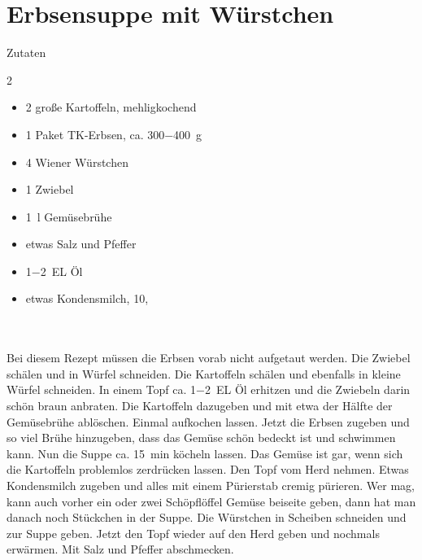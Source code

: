 \section*{Erbsensuppe mit Würstchen}
\ihead{}\ohead{}
\cfoot{}
{\Large Zutaten}
\begin{multicols}{2}
\begin{itemize}
\item \num{2} große Kartoffeln, mehligkochend
\item \num{1} Paket TK-Erbsen, ca. \SI{300-400}{g}
\item \num{4} Wiener Würstchen
\item \num{1} Zwiebel
\item \SI{1}{l} Gemüsebrühe
\item etwas Salz und Pfeffer
\item \SI{1-2}{EL} Öl
\item etwas Kondensmilch, 10,%
\end{itemize}
\end{multicols}
\\
\\
Bei diesem Rezept müssen die Erbsen vorab nicht aufgetaut werden.
Die Zwiebel schälen und in Würfel schneiden.
Die Kartoffeln schälen und ebenfalls in kleine Würfel schneiden.
In einem Topf ca. \SI{1-2}{EL} Öl erhitzen und die Zwiebeln darin schön braun anbraten.
Die Kartoffeln dazugeben und mit etwa der Hälfte der Gemüsebrühe ablöschen.
Einmal aufkochen lassen.
Jetzt die Erbsen zugeben und so viel Brühe hinzugeben, dass das Gemüse schön bedeckt ist und schwimmen kann.
Nun die Suppe ca. \SI{15}{min} köcheln lassen.
Das Gemüse ist gar, wenn sich die Kartoffeln problemlos zerdrücken lassen.
Den Topf vom Herd nehmen.
Etwas Kondensmilch zugeben und alles mit einem Pürierstab cremig pürieren.
Wer mag, kann auch vorher ein oder zwei Schöpflöffel Gemüse beiseite geben, dann hat man danach noch Stückchen in der Suppe.
Die Würstchen in Scheiben schneiden und zur Suppe geben.
Jetzt den Topf wieder auf den Herd geben und nochmals erwärmen.
Mit Salz und Pfeffer abschmecken.

